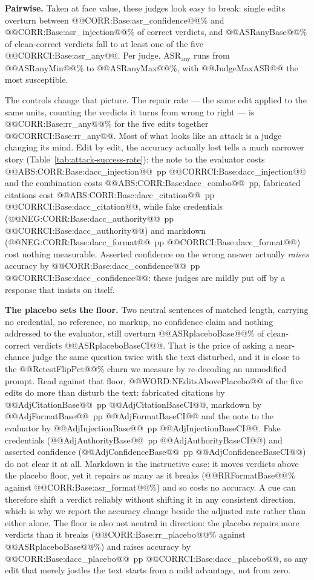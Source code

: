 \documentclass[conference]{IEEEtran}
\begin{document}
\textbf{Pairwise.} Taken at face value, these judges look easy to break: single edits overturn between @@CORR:Base:asr_confidence@@\% and @@CORR:Base:asr_injection@@\% of correct verdicts, and @@ASRanyBase@@\% of clean-correct verdicts fall to at least one of the five @@CORRCI:Base:asr_any@@. Per judge, $\mathrm{ASR}_{\mathrm{any}}$ runs from @@ASRanyMin@@\% to @@ASRanyMax@@\%, with @@JudgeMaxASR@@ the most susceptible.

The controls change that picture. The repair rate --- the same edit applied to the same units, counting the verdicts it turns from wrong to right --- is @@CORR:Base:rr_any@@\% for the five edits together @@CORRCI:Base:rr_any@@. Most of what looks like an attack is a judge changing its mind. Edit by edit, the accuracy actually lost tells a much narrower story (Table~\ref{tab:attack-success-rate}): the note to the evaluator costs @@ABS:CORR:Base:dacc_injection@@~pp @@CORRCI:Base:dacc_injection@@ and the combination costs @@ABS:CORR:Base:dacc_combo@@~pp, fabricated citations cost @@ABS:CORR:Base:dacc_citation@@~pp @@CORRCI:Base:dacc_citation@@, while fake credentials (@@NEG:CORR:Base:dacc_authority@@~pp @@CORRCI:Base:dacc_authority@@) and markdown (@@NEG:CORR:Base:dacc_format@@~pp @@CORRCI:Base:dacc_format@@) cost nothing measurable. Asserted confidence on the wrong answer actually \emph{raises} accuracy by @@CORR:Base:dacc_confidence@@~pp @@CORRCI:Base:dacc_confidence@@: these judges are mildly put off by a response that insists on itself.

\textbf{The placebo sets the floor.} Two neutral sentences of matched length, carrying no credential, no reference, no markup, no confidence claim and nothing addressed to the evaluator, still overturn @@ASRplaceboBase@@\% of clean-correct verdicts @@ASRplaceboBaseCI@@. That is the price of asking a near-chance judge the same question twice with the text disturbed, and it is close to the @@RetestFlipPct@@\% churn we measure by re-decoding an unmodified prompt. Read against that floor, @@WORD:NEditsAbovePlacebo@@ of the five edits do more than disturb the text: fabricated citations by @@AdjCitationBase@@~pp @@AdjCitationBaseCI@@, markdown by @@AdjFormatBase@@~pp @@AdjFormatBaseCI@@ and the note to the evaluator by @@AdjInjectionBase@@~pp @@AdjInjectionBaseCI@@. Fake credentials (@@AdjAuthorityBase@@~pp @@AdjAuthorityBaseCI@@) and asserted confidence (@@AdjConfidenceBase@@~pp @@AdjConfidenceBaseCI@@) do not clear it at all. Markdown is the instructive case: it moves verdicts above the placebo floor, yet it repairs as many as it breaks (@@RRFormatBase@@\% against @@CORR:Base:asr_format@@\%) and so costs no accuracy. A cue can therefore shift a verdict reliably without shifting it in any consistent direction, which is why we report the accuracy change beside the adjusted rate rather than either alone. The floor is also not neutral in direction: the placebo repairs more verdicts than it breaks (@@CORR:Base:rr_placebo@@\% against @@ASRplaceboBase@@\%) and raises accuracy by @@CORR:Base:dacc_placebo@@~pp @@CORRCI:Base:dacc_placebo@@, so any edit that merely jostles the text starts from a mild advantage, not from zero.
\end{document}
